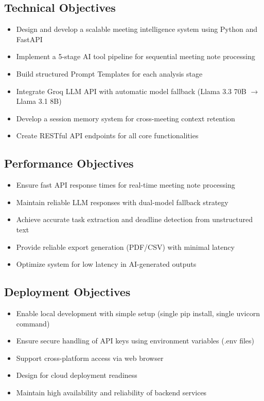 \documentclass[12pt,a4paper]{article}
\begin{document}
\subsection{Technical Objectives}
\begin{itemize}
  \item Design and develop a scalable meeting intelligence system using Python and FastAPI
  \item Implement a 5-stage AI tool pipeline for sequential meeting note processing
  \item Build structured Prompt Templates for each analysis stage
  \item Integrate Groq LLM API with automatic model fallback (Llama 3.3 70B $\rightarrow$ Llama 3.1 8B)
  \item Develop a session memory system for cross-meeting context retention
  \item Create RESTful API endpoints for all core functionalities
\end{itemize}

\subsection{Performance Objectives}
\begin{itemize}
  \item Ensure fast API response times for real-time meeting note processing
  \item Maintain reliable LLM responses with dual-model fallback strategy
  \item Achieve accurate task extraction and deadline detection from unstructured text
  \item Provide reliable export generation (PDF/CSV) with minimal latency
  \item Optimize system for low latency in AI-generated outputs
\end{itemize}

\subsection{Deployment Objectives}
\begin{itemize}
  \item Enable local development with simple setup (single pip install, single uvicorn command)
  \item Ensure secure handling of API keys using environment variables (.env files)
  \item Support cross-platform access via web browser
  \item Design for cloud deployment readiness
  \item Maintain high availability and reliability of backend services
\end{itemize}
\end{document}
